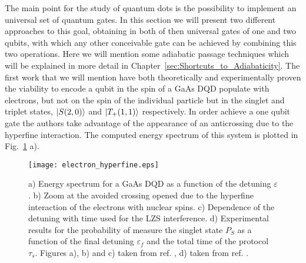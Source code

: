 The main point for the study of quantum dots is the possibility to implement an universal set of quantum gates. In this section we will present two different approaches to this goal, obtaining in both of then universal gates of one and two qubits, with which any other conceivable gate can be achieved by combining this two operations. Here we will mention some adiabatic passage techniques which will be explained in more detail in Chapter~\ref{sec:Shortcuts_to_Adiabaticity}. The first work that we will mention have both theoretically and experimentally proven \cite{Petta2010,Ribeiro2009,Ribeiro2010} the viability to encode a qubit in the spin of a GaAs DQD populate with electrons, but not on the spin of the individual particle but in the singlet and triplet states, $\ket{S(2,0)}$ and $\ket{T_+(1,1)}$ respectively. In order achieve a one qubit gate the authors take advantage of the appearance of an anticrossing due to the hyperfine interaction. The computed energy spectrum of this system is plotted in Fig.~\ref{fig:electron_hyperfine} a).
\begin{figure}[!htb]
	\centering
	\texttt{[image: electron\_hyperfine.eps]}
	\caption{a) Energy spectrum for a GaAs DQD as a function of the detuning $\varepsilon$. b) Zoom at the avoided crossing opened due to the hyperfine interaction of the electrons with nuclear spins. c) Dependence of the detuning with time used for the LZS interference. d) Experimental results for the probability of measure the singlet state $P_S$ as a function of the final detuning $\varepsilon_f$ and the total time of the protocol  $\tau_{s}$. Figures a), b) and c) taken from ref. \cite{Ribeiro2010}, d) taken from ref. \cite{Petta2010}.}
	\label{fig:electron_hyperfine}
\end{figure}

